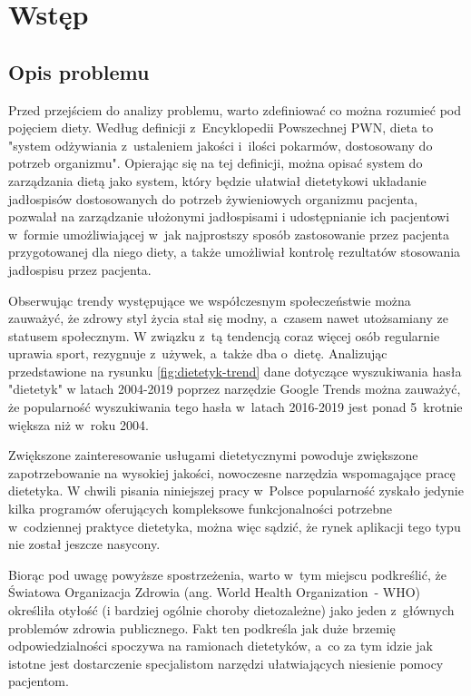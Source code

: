 \chapter*{Wstęp}\label{ch:admission}

\section*{Opis problemu}\label{sec:problem-description}

Przed przejściem do analizy problemu, warto zdefiniować co można rozumieć pod pojęciem diety.
Według definicji z~Encyklopedii Powszechnej PWN, dieta to "system odżywiania z~ustaleniem jakości i~ilości pokarmów,
dostosowany do potrzeb organizmu"\cite{book:encyklopedia-dieta}.
Opierając się na tej definicji, można opisać system do zarządzania dietą jako system,
który będzie ułatwiał dietetykowi układanie jadłospisów dostosowanych do potrzeb żywieniowych organizmu pacjenta, pozwalał na zarządzanie ułożonymi jadłospisami
i udostępnianie ich pacjentowi w~formie umożliwiającej w~jak najprostszy sposób zastosowanie przez pacjenta przygotowanej dla niego diety,
a także umożliwiał kontrolę rezultatów stosowania jadłospisu przez pacjenta.

\par
Obserwując trendy występujące we współczesnym społeczeństwie można zauważyć, że zdrowy styl życia stał się modny, a~czasem nawet utożsamiany ze statusem społecznym.
W związku z~tą tendencją coraz więcej osób regularnie uprawia sport, rezygnuje z~używek, a~także dba o~dietę.
Analizując przedstawione na rysunku \ref{fig:dietetyk-trend} dane dotyczące wyszukiwania hasła "dietetyk" w latach 2004-2019 poprzez narzędzie Google Trends\cite{url:google-trends} można zauważyć,
że popularność wyszukiwania tego hasła w~latach 2016-2019 jest ponad 5~krotnie większa niż w~roku 2004.


Zwiększone zainteresowanie usługami dietetycznymi powoduje zwiększone zapotrzebowanie na wysokiej jakości, nowoczesne narzędzia wspomagające pracę dietetyka.
W chwili pisania niniejszej pracy w~Polsce popularność zyskało jedynie kilka programów oferujących kompleksowe funkcjonalności potrzebne w~codziennej praktyce dietetyka,
można więc sądzić, że rynek aplikacji tego typu nie został jeszcze nasycony.

\par
Biorąc pod uwagę powyższe spostrzeżenia, warto w~tym miejscu podkreślić, że Światowa Organizacja Zdrowia (ang. World Health Organization~- WHO) określiła otyłość
(i bardziej ogólnie choroby dietozależne) jako jeden z~głównych problemów zdrowia publicznego\cite{article:dietetyk-na-rynku-uslug-medycznych}.
Fakt ten podkreśla jak duże brzemię odpowiedzialności spoczywa na ramionach dietetyków,
a~co za tym idzie jak istotne jest dostarczenie specjalistom narzędzi ułatwiających niesienie pomocy pacjentom.

